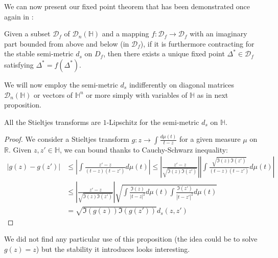 \documentclass[a4papaer, titlepage]{book}
\begin{document}
We can now present our fixed point theorem that has been demonstrated once again in \cite{louart2022concentration}:
\begin{theorem}\label{the:fixed_point_theorem}
  Given a subset $\mathcal D_f$ of $\mathcal D_n(\mathbb H)$ and a mapping $f: \mathcal D_f\to \mathcal D_f$ with an imaginary part bounded from above and below (in $\mathcal D_f$), if it is furthermore contracting for the stable semi-metric $d_s$ on $D_f$, then there exists a unique fixed point $\Delta^*\in\mathcal D_f$ satisfying $\Delta^* = f(\Delta^*)$.
\end{theorem}
We will now employ the semi-metric $d_s$ indifferently on diagonal matrices $\mathcal D_n(\mathbb H)$ or vectors of $\mathbb H^n$ or more simply with variables of $\mathbb H$ as in next proposition.
\begin{proposition}\label{pro:Stieltjes_transforms_are_1_Lipschitz}
  All the Stieltjes transforms are $1$-Lipschitz for the semi-metric $d_s$ on $\mathbb H$.
\end{proposition}
\begin{proof}
  We consider a Stieltjes transform $g : z \to \int \frac{d\mu(t)}{t-z}$ for a given measure $\mu$ on $\mathbb R$. Given $z,z' \in \mathbb H$, we can bound thanks to Cauchy-Schwarz inequality:
  \begin{align*}
    |g(z) - g(z') |
    &\leq \left\vert \int \frac{z' -z }{(t-z)(t-z')} d\mu(t)\right\vert
    \leq \left\vert \frac{z' -z }{\sqrt{\Im(z)\Im(z')}}\right\vert\left\vert \int \frac{\sqrt{\Im(z)\Im(z')} }{(t-z)(t-z')} d\mu(t)\right\vert\\
    &\leq \left\vert \frac{z' -z }{\sqrt{\Im(z)\Im(z')}}\right\vert \sqrt{\int \frac{\Im(z) }{|t-z|^2} d\mu(t)\int \frac{\Im(z') }{|t-z'|^2} d\mu(t)}\\
    & = \sqrt{\Im(g(z))\Im(g(z'))} d_s(z,z')
  \end{align*}
\end{proof}
We did not find any particular use of this proposition (the idea could be to solve $g(z) = z$) but the stability it introduces looks interesting. 

\end{document}
